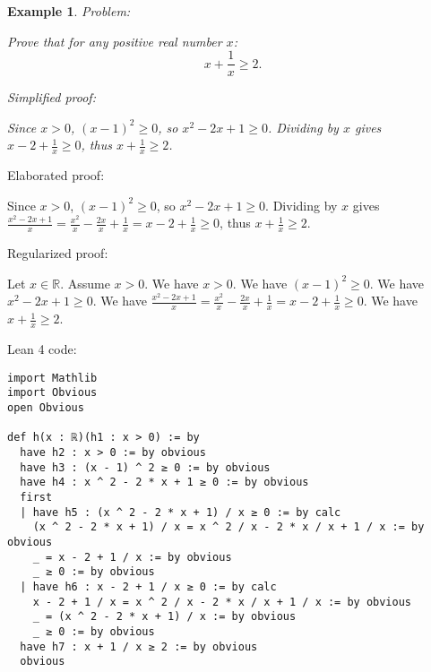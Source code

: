 \documentclass{article}
\newtheorem{example}{Example}
\begin{document}
\begin{example}
Problem:
\begin{tcolorbox}[colback=yellow!10, width=\linewidth]
Prove that for any positive real number $x$:
    $$x + \frac{1}{x} \geq 2.$$
\end{tcolorbox}

Simplified proof:
\begin{tcolorbox}[colback=blue!10, width=\linewidth]
Since $x>0$, $(x-1)^2 \ge 0$, so $x^2 - 2x + 1 \ge 0$. Dividing by $x$ gives $x - 2 + \frac{1}{x} \ge 0$, thus $x + \frac{1}{x} \ge 2$.
\end{tcolorbox}
\end{example}

Elaborated proof:
\begin{tcolorbox}[colback=green!10, width=\linewidth]
Since $x>0$, $(x-1)^2 \ge 0$, so $x^2 - 2x + 1 \ge 0$. Dividing by $x$ gives $\frac{x^2 - 2x + 1}{x} = \frac{x^2}{x} - \frac{2x}{x} + \frac{1}{x} = x - 2 + \frac{1}{x} \ge 0$, thus $x + \frac{1}{x} \ge 2$.
\end{tcolorbox}

Regularized proof:
\begin{tcolorbox}[colback=red!10, width=\linewidth]
Let $x\in\mathbb{R}$. Assume $x > 0$.
We have $x > 0$. We have ${(x-1)}^2 \ge 0$. We have $x^2 - 2x + 1 \ge 0$. We have $\frac{x^2 - 2x + 1}{x} = \frac{x^2}{x} - \frac{2x}{x} + \frac{1}{x} = x - 2 + \frac{1}{x} \ge 0$. We have $x + \frac{1}{x} \ge 2$.
\end{tcolorbox}

Lean 4 code:
\begin{tcolorbox}[colback=white!10, width=\linewidth]
\begin{lstlisting}[language=Lean4]
import Mathlib
import Obvious
open Obvious

def h(x : ℝ)(h1 : x > 0) := by
  have h2 : x > 0 := by obvious
  have h3 : (x - 1) ^ 2 ≥ 0 := by obvious
  have h4 : x ^ 2 - 2 * x + 1 ≥ 0 := by obvious
  first
  | have h5 : (x ^ 2 - 2 * x + 1) / x ≥ 0 := by calc
    (x ^ 2 - 2 * x + 1) / x = x ^ 2 / x - 2 * x / x + 1 / x := by obvious
    _ = x - 2 + 1 / x := by obvious
    _ ≥ 0 := by obvious
  | have h6 : x - 2 + 1 / x ≥ 0 := by calc
    x - 2 + 1 / x = x ^ 2 / x - 2 * x / x + 1 / x := by obvious
    _ = (x ^ 2 - 2 * x + 1) / x := by obvious
    _ ≥ 0 := by obvious
  have h7 : x + 1 / x ≥ 2 := by obvious
  obvious

\end{lstlisting}
\end{tcolorbox}
\end{document}
